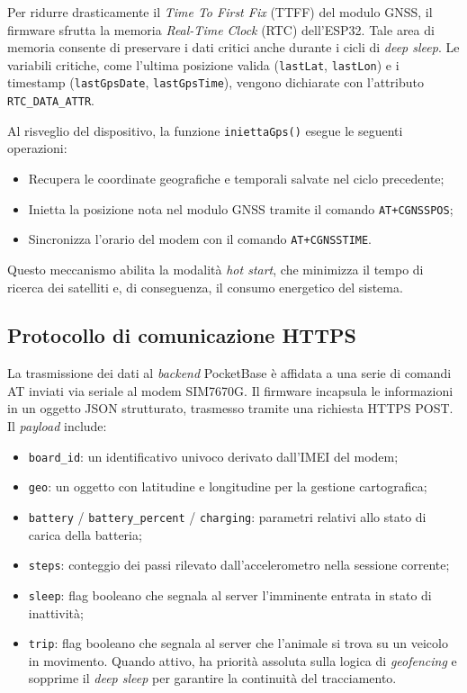 \documentclass[12pt,a4paper]{article}
\begin{document}
Per ridurre drasticamente il \textit{Time To First Fix} (TTFF) del modulo GNSS, il firmware
sfrutta la memoria \textit{Real-Time Clock} (RTC) dell'ESP32. 
Tale area di memoria consente di preservare i dati critici 
anche durante i cicli di \textit{deep sleep}. 
Le variabili critiche, come l'ultima posizione valida 
(\texttt{lastLat}, \texttt{lastLon}) e i timestamp
(\texttt{lastGpsDate}, \texttt{lastGpsTime}), 
vengono dichiarate con l'attributo \texttt{RTC\_DATA\_ATTR}.

Al risveglio del dispositivo, la funzione \texttt{iniettaGps()} esegue le seguenti operazioni:
\begin{itemize}
    \item Recupera le coordinate geografiche e temporali salvate nel ciclo precedente;
    \item Inietta la posizione nota nel modulo GNSS tramite il comando \texttt{AT+CGNSSPOS};
    \item Sincronizza l'orario del modem con il comando \texttt{AT+CGNSSTIME}.
\end{itemize}

Questo meccanismo abilita la modalità \textit{hot start}, che minimizza il tempo di ricerca dei
satelliti e, di conseguenza, il consumo energetico del sistema.

\subsection{Protocollo di comunicazione HTTPS}

La trasmissione dei dati al \textit{backend} PocketBase è affidata a una serie di comandi AT inviati
via seriale al modem SIM7670G. Il firmware incapsula le informazioni in un oggetto JSON
strutturato, trasmesso tramite una richiesta HTTPS POST. Il \textit{payload} include:

\begin{itemize}
    \item \texttt{board\_id}: un identificativo univoco derivato dall'IMEI del modem;
    \item \texttt{geo}: un oggetto con latitudine e longitudine per la gestione cartografica;
    \item \texttt{battery} / \texttt{battery\_percent} / \texttt{charging}:
          parametri relativi allo stato di carica della batteria;
    \item \texttt{steps}: conteggio dei passi rilevato dall'accelerometro nella sessione corrente;
    \item \texttt{sleep}: flag booleano che segnala al server l'imminente entrata in stato
          di inattività;
    \item \texttt{trip}: flag booleano che segnala al server che l'animale si trova su un
          veicolo in movimento. Quando attivo, ha priorità assoluta sulla logica di \textit{geofencing}
          e sopprime il \textit{deep sleep} per garantire la continuità del tracciamento.
\end{itemize}
\end{document}
